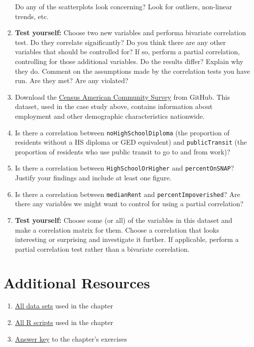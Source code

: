 \begin{enumerate}
	Do any of the scatterplots look concerning? Look for outliers, non-linear trends, etc.
	\item \textbf{Test yourself:} Choose two new variables and performa bivariate correlation test. Do they correlate significantly? Do you think there are any other variables that should be controlled for? If so, perform a partial correlation, controlling for those additional variables. Do the results differ? Explain why they do. Comment on the assumptions made by the correlation tests you have run. Are they met? Are any violated?
	\item Download the \href{https://raw.githubusercontent.com/faulconbridge/appliedStats/master/LaTeX/part03/data/correlationCaseStudy.csv}{Census American Community Survey} from GitHub. This dataset, used in the case study above, contains information about employment and other demographic characteristics nationwide.
	\item Is there a correlation between \verb|noHighSchoolDiploma| (the proportion of residents without a HS diploma or GED equivalent) and \verb|publicTransit| (the proportion of residents who use public transit to go to and from work)?
	\item Is there a correlation between \verb|HighSchoolOrHigher| and \verb|percentOnSNAP|? Justify your findings and include at least one figure.
	\item Is there a correlation between \verb|medianRent| and \verb|percentImpoverished|? Are there any variables we might want to control for using a partial correlation?
	\item \textbf{Test yourself:} Choose some (or all) of the variables in this dataset and make a correlation matrix for them. Choose a correlation that looks interesting or surprising and investigate it further. If applicable, perform a partial correlation test rather than a bivariate correlation.
\end{enumerate}

\section{Additional Resources}

\begin{enumerate}
\item \href{https://github.com/faulconbridge/appliedStats/tree/master/LaTeX/part03/data}{All data sets} used in the chapter
\item \href{https://github.com/faulconbridge/appliedStats/tree/master/LaTeX/part03/RScripts}{All R scripts} used in the chapter
\item \href{https://github.com/faulconbridge/appliedStats/blob/master/LaTeX/part03/answers/correlation.md}{Answer key} to the chapter's exercises
\end{enumerate}